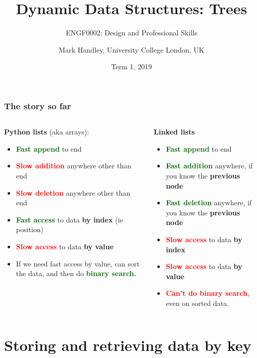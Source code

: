 \documentclass{beamer} %
\author{Mark Handley, University College London, UK}
\title{Dynamic Data Structures: Trees}
\subtitle{ENGF0002: Design and Professional Skills }
\date{Term 1, 2019}
\newcommand\good[1]{\textcolor{darkgreen}{\textbf{#1}}}
\newcommand\bad[1]{\textcolor{red}{\textbf{#1}}}
\begin{document}
\nobibliography*


\frame{
\titlepage
}

\begin{frame}
  \frametitle{The story so far} %
  \begin{columns}
\begin{column}{0.5\textwidth}
  \textbf{Python lists} (aka arrays):
  \begin{itemize}
  \item \good{Fast append} to end
  \item \bad{Slow addition} anywhere other than end
  \item \bad{Slow deletion} anywhere other than end
  \item \good{Fast access} to data \textbf{by index} (ie position)
  \item \bad{Slow access} to data \textbf{by value}
  \item If we need fast access by value, can sort the data, and then do \good{binary search.}
  \end{itemize}
\end{column}
\begin{column}{0.5\textwidth}
  \textbf{Linked lists}
  \begin{itemize}
  \item \good{Fast append} to end
  \item \good{Fast addition} anywhere, if you know the \textbf{previous node}
  \item \good{Fast deletion} anywhere, if you know the \textbf{previous node}
  \item \bad{Slow access} to data \textbf{by index}
  \item \bad{Slow access} to data \textbf{by value}
  \item \bad{Can't do binary search}, even on sorted data.
  \end{itemize}
\end{column}
\end{columns}
\end{frame}

\section{Storing and retrieving data by key}
\end{document}
